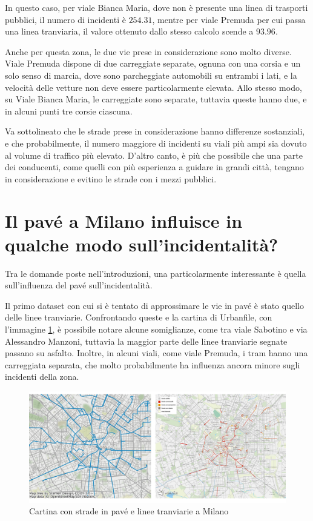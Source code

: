 \documentclass[a4paper,12pt]{report}
\begin{document}
In questo caso, per viale Bianca Maria, dove non è presente una linea di trasporti pubblici, 
il numero di incidenti è $254.31$, mentre per viale Premuda per cui passa una linea tranviaria, 
il valore ottenuto dallo stesso calcolo scende a $93.96$.

Anche per questa zona, le due vie prese in considerazione sono molto diverse.
Viale Premuda dispone di due carreggiate separate, ognuna con una corsia e un solo senso 
di marcia, dove sono parcheggiate automobili su entrambi i lati, e la velocità delle 
vetture non deve essere particolarmente elevata.
Allo stesso modo, su Viale Bianca Maria, le carreggiate sono separate, tuttavia queste 
hanno due, e in alcuni punti tre corsie ciascuna. 

Va sottolineato che le strade prese in considerazione hanno differenze sostanziali, 
e che probabilmente, il numero maggiore di incidenti su viali più ampi sia dovuto al 
volume di traffico più elevato.
D'altro canto, è più che possibile che una parte dei conducenti, 
come quelli con più esperienza 
a guidare in grandi città, tengano in considerazione e evitino le strade con i mezzi pubblici.

\section{Il pavé a Milano influisce in qualche modo sull'incidentalità?}

Tra le domande poste nell'introduzioni, una particolarmente interessante è quella 
sull'influenza del pavé sull'incidentalità.

Il primo dataset con cui si è tentato di approssimare le vie in pavé è stato quello 
delle linee tranviarie. 
Confrontando queste e la cartina di Urbanfile, con l'immagine \ref{fig:tram-pave-milano}, 
è possibile notare alcune somiglianze, come tra viale Sabotino e via 
Alessandro Manzoni, tuttavia la maggior parte delle linee tranviarie segnate 
passano su asfalto.
Inoltre, in alcuni viali, come viale Premuda, i tram hanno una carreggiata separata, 
che molto probabilmente ha influenza ancora minore sugli incidenti della zona.

\begin{figure}
    \includegraphics[width=\linewidth]{../src/tram/tram_milano.png}
    \caption{Cartina con strade in pavé e linee tranviarie a Milano}
    \label{fig:tram-pave-milano}
\end{figure}
\end{document}
